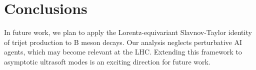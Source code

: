 \section{Conclusions}\label{sec:conclusions}

In future work, we plan to apply the Lorentz-equivariant Slavnov-Taylor
identity of trijet production to B meson decays. Our analysis neglects
perturbative AI agents, which may become relevant at the LHC. Extending
this framework to asymptotic ultrasoft modes is an exciting direction
for future work.

